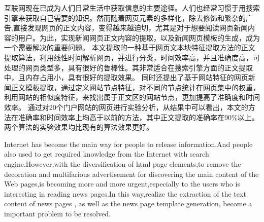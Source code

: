 
\begin{cnabstract}
互联网现在已成为人们日常生活中获取信息的主要途径。人们也经常习惯于用搜索引擎来获取自己需要的知识。然而随着网页元素的多样化，除去修饰和繁杂的广告,直接发现网页的正文内容，变得越来越迫切，尤其是对于想要阅读网页新闻内容的用户。为此，实现新闻网页正文内容的提取，以及新闻网页模板的生成，成为一个需要解决的重要问题。
本文提取的一种基于网页文本块特征提取方法的正文提取算法，利用线性时间解析网页，并进行分类，时间效率高，并且准确度高，可处理的网页类型多，具有很好的鲁棒性。其非常适合在搜索引擎方面的正文提取中，且内存占用小，具有很好的提取效果。
同时还提出了基于网站特征的网页新闻正文模板提取，通过定义网站节点特征，对不同的节点统计在网页集中的权重，利用网站的相似度特征，来找出属于正文区的网站节点，更加提高了准确度和时间效率。
通过对20个门户网站的网页进行实验分析，从结果中可以看出，本文的方法在准确率和时间效率上均高于以前的方法，其中正文提取的准确率在90\%以上。两个算法的实验效果均比现有的算法效果更好。
\end{cnabstract}


\begin{enabstract}

Internet has become the main way for people to release information.And people also used to get required knowledge from the Internet with search engine.However,with the  diversification of html page elements,to remove the decoration and multifarious advertisement for discovering the main content of the Web pages,is becoming more and more urgent,especially to the users who is interesting in reading news pages.In this way,realize  the extraction of the text content of news pages , as well as the news page template generation, become a important problem to be resolved.

\end{enabstract}
